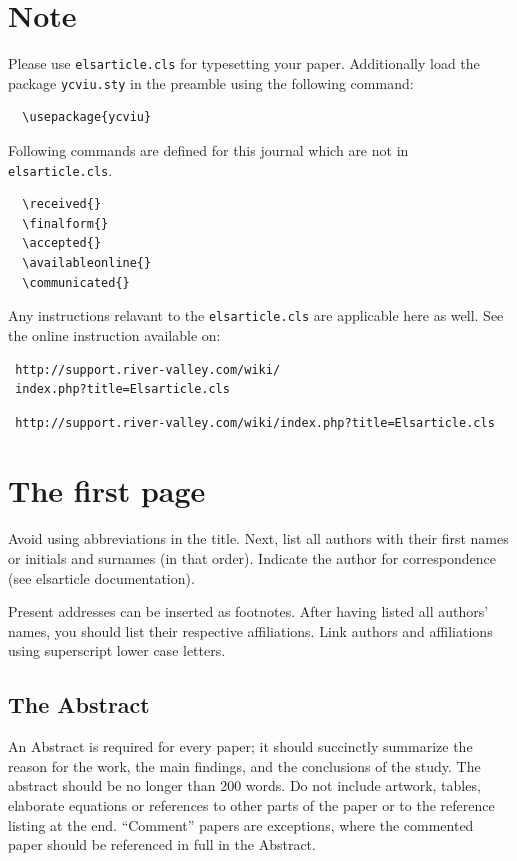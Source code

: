 \documentclass[times,referee,twocolumn,final,authoryear]{elsarticle}
\begin{document}

\section{Note}
\label{sec1}
Please use \verb+elsarticle.cls+ for typesetting your paper.
Additionally load the package \verb+ycviu.sty+ in the preamble using
the following command: 
\begin{verbatim} 
  \usepackage{ycviu}
\end{verbatim}

Following commands are defined for this journal which are not in
\verb+elsarticle.cls+. 
\begin{verbatim}
  \received{}
  \finalform{}
  \accepted{}
  \availableonline{}
  \communicated{}
\end{verbatim}

Any instructions relavant to the \verb+elsarticle.cls+ are applicable
here as well. See the online instruction available on:
\makeatletter
\if@twocolumn
\begin{verbatim}
 http://support.river-valley.com/wiki/
 index.php?title=Elsarticle.cls
\end{verbatim}
\else
\begin{verbatim}
 http://support.river-valley.com/wiki/index.php?title=Elsarticle.cls
\end{verbatim}
\fi

\section{The first page}
Avoid using abbreviations in the title. Next, list all authors with
their first names or initials and surnames (in that order). Indicate
the author for correspondence (see elsarticle documentation).

Present addresses can be inserted as footnotes. After having listed all
authors' names, you should list their respective affiliations. Link
authors and affiliations using superscript lower case letters.

\subsection{The Abstract}
An Abstract is required for every paper; it should succinctly summarize
the reason for the work, the main findings, and the conclusions of the
study. The abstract should be no longer than 200 words. Do not include
artwork, tables, elaborate equations or references to other parts of
the paper or to the reference listing at the end. ``Comment'' papers
are exceptions, where the commented paper should be referenced in full
in the Abstract.
\end{document}
